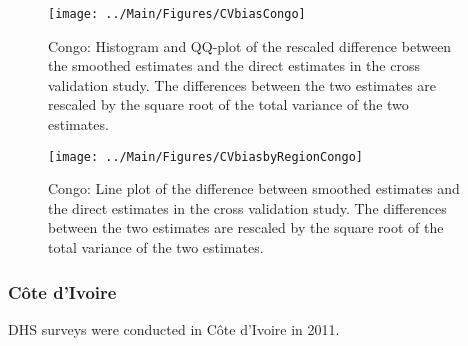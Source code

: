 \documentclass[12pt]{article}\usepackage[]{graphicx}\usepackage[]{color}
\newenvironment{knitrout}{}{} %
\begin{document}
\begin{knitrout}
\color{fgcolor}\begin{figure}[bht]

{\centering \texttt{[image: ../Main/Figures/CVbiasCongo]} 

}

\caption[Congo]{Congo: Histogram and QQ-plot of the rescaled difference between the smoothed estimates and the direct estimates in the cross validation study. The differences between the two estimates are rescaled by the square root of the total variance of the two estimates.}\label{fig:unnamed-chunk-79}
\end{figure}


\end{knitrout}

\begin{knitrout}
\color{fgcolor}\begin{figure}[bht]

{\centering \texttt{[image: ../Main/Figures/CVbiasbyRegionCongo]} 

}

\caption[Congo]{Congo: Line plot of the difference between smoothed estimates and the direct estimates in the cross validation study. The differences between the two estimates are rescaled by the square root of the total variance of the two estimates.}\label{fig:unnamed-chunk-80}
\end{figure}


\end{knitrout}

\clearpage
\subsubsection{C\^{o}te d'Ivoire}





DHS surveys were conducted in C\^{o}te d'Ivoire in 2011.
\end{document}
